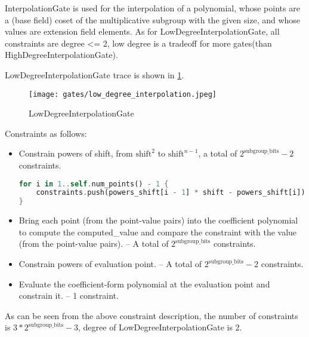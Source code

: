 
\hspace*{\fill}

\indent InterpolationGate is used for the interpolation of a polynomial, whose points are a (base field) coset of the multiplicative subgroup 
with the given size, and whose values are extension field elements. As for LowDegreeInterpolationGate,  all constraints are degree <= 2, 
low degree is a tradeoff for more gates(than HighDegreeInterpolationGate).

LowDegreeInterpolationGate trace is shown in \ref{fig:low-degree-interpolation}.

\begin{figure}[!ht]
    \centering
    \texttt{[image: gates/low\_degree\_interpolation.jpeg]}
    \caption{LowDegreeInterpolationGate}
    \label{fig:low-degree-interpolation}
\end{figure}

Constraints as follows:
\begin{itemize}
    \item Constrain powers of shift, from $\text{shift}^2$ to $\text{shift}^{n-1}$, a total of $2^{\text{subgroup\_bits}}-2$ constraints.
    \begin{lstlisting}[language=rust]
for i in 1..self.num_points() - 1 {
    constraints.push(powers_shift[i - 1] * shift - powers_shift[i]);
}
    \end{lstlisting}
    \item Bring each point (from the point-value pairs) into the coefficient polynomial to compute the computed\_value 
    and compare the constraint with the value (from the point-value pairs). -- A total of $2^{\text{subgroup\_bits}}$ constraints.
    \item Constrain powers of evaluation point. -- A total of $2^{\text{subgroup\_bits}}-2$ constraints.
    \item Evaluate the coefficient-form polynomial at the evaluation point and constrain it. -- 1 constraint.
\end{itemize}

As can be seen from the above constraint description, the number of constraints is $3*2^{\text{subgroup\_bits}}-3$, degree of LowDegreeInterpolationGate is 2.
